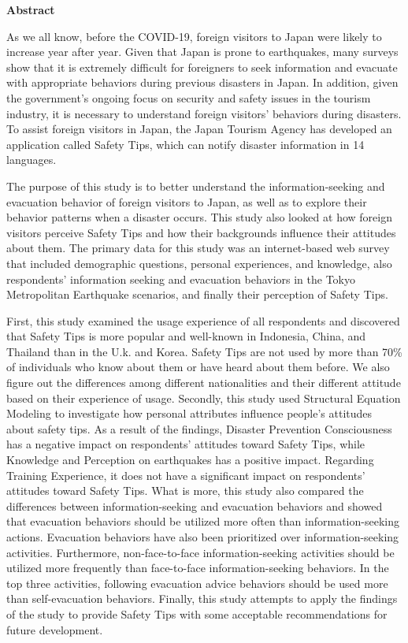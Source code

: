 
\begin{center}\textbf{Abstract}\end{center}

As we all know, before the COVID-19, foreign visitors to Japan were likely to increase year after year. Given that Japan is prone to earthquakes, many surveys show that it is extremely difficult for foreigners to seek information and evacuate with appropriate behaviors during previous disasters in Japan. In addition, given the government's ongoing focus on security and safety issues in the tourism industry, it is necessary to understand foreign visitors' behaviors during disasters. To assist foreign visitors in Japan, the Japan Tourism Agency has developed an application called Safety Tips, which can notify disaster information in 14 languages.

The purpose of this study is to better understand the information-seeking and evacuation behavior of foreign visitors to Japan, as well as to explore their behavior patterns when a disaster occurs. This study also looked at how foreign visitors perceive Safety Tips and how their backgrounds influence their attitudes about them. The primary data for this study was an internet-based web survey that included demographic questions, personal experiences, and knowledge, also respondents' information seeking and evacuation behaviors in the Tokyo Metropolitan Earthquake scenarios, and finally their perception of Safety Tips. 

First, this study examined the usage experience of all respondents and discovered that Safety Tips is more popular and well-known in Indonesia, China, and Thailand than in the U.k. and Korea. Safety Tips are not used by more than 70\% of individuals who know about them or have heard about them before. We also figure out the differences among different nationalities and their different attitude based on their experience of usage. Secondly, this study used Structural Equation Modeling to investigate how personal attributes influence people's attitudes about safety tips. As a result of the findings, Disaster Prevention Consciousness has a negative impact on respondents' attitudes toward Safety Tips, while Knowledge and Perception on earthquakes has a positive impact. Regarding Training Experience, it does not have a significant impact on respondents' attitudes toward Safety Tips. What is more, this study also compared the differences between information-seeking and evacuation behaviors and showed that evacuation behaviors should be utilized more often than information-seeking actions. Evacuation behaviors have also been prioritized over information-seeking activities. Furthermore, non-face-to-face information-seeking activities should be utilized more frequently than face-to-face information-seeking behaviors. In the top three activities, following evacuation advice behaviors should be used more than self-evacuation behaviors. Finally, this study attempts to apply the findings of the study to provide Safety Tips with some acceptable recommendations for future development. 


\cleardoublepage
